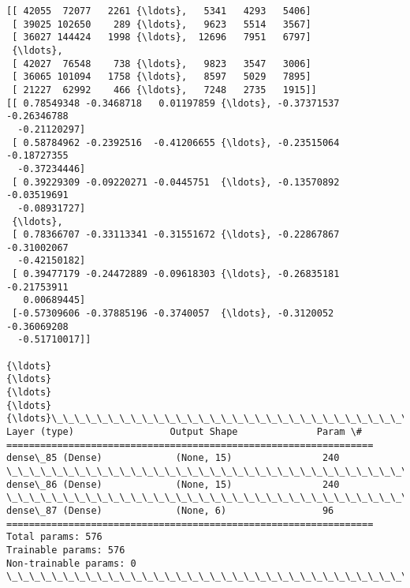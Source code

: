 \documentclass[11pt]{article}
\begin{document}
    \begin{Verbatim}[commandchars=\\\{\}]
[[ 42055  72077   2261 {\ldots},   5341   4293   5406]
 [ 39025 102650    289 {\ldots},   9623   5514   3567]
 [ 36027 144424   1998 {\ldots},  12696   7951   6797]
 {\ldots}, 
 [ 42027  76548    738 {\ldots},   9823   3547   3006]
 [ 36065 101094   1758 {\ldots},   8597   5029   7895]
 [ 21227  62992    466 {\ldots},   7248   2735   1915]]
[[ 0.78549348 -0.3468718   0.01197859 {\ldots}, -0.37371537 -0.26346788
  -0.21120297]
 [ 0.58784962 -0.2392516  -0.41206655 {\ldots}, -0.23515064 -0.18727355
  -0.37234446]
 [ 0.39229309 -0.09220271 -0.0445751  {\ldots}, -0.13570892 -0.03519691
  -0.08931727]
 {\ldots}, 
 [ 0.78366707 -0.33113341 -0.31551672 {\ldots}, -0.22867867 -0.31002067
  -0.42150182]
 [ 0.39477179 -0.24472889 -0.09618303 {\ldots}, -0.26835181 -0.21753911
   0.00689445]
 [-0.57309606 -0.37885196 -0.3740057  {\ldots}, -0.3120052  -0.36069208
  -0.51710017]]

{\ldots}
{\ldots}
{\ldots}
{\ldots}
{\ldots}\_\_\_\_\_\_\_\_\_\_\_\_\_\_\_\_\_\_\_\_\_\_\_\_\_\_\_\_\_\_\_\_\_\_\_\_\_\_\_\_\_\_\_\_\_\_\_\_\_\_\_\_\_\_\_\_\_\_\_\_\_\_\_\_\_
Layer (type)                 Output Shape              Param \#   
=================================================================
dense\_85 (Dense)             (None, 15)                240       
\_\_\_\_\_\_\_\_\_\_\_\_\_\_\_\_\_\_\_\_\_\_\_\_\_\_\_\_\_\_\_\_\_\_\_\_\_\_\_\_\_\_\_\_\_\_\_\_\_\_\_\_\_\_\_\_\_\_\_\_\_\_\_\_\_
dense\_86 (Dense)             (None, 15)                240       
\_\_\_\_\_\_\_\_\_\_\_\_\_\_\_\_\_\_\_\_\_\_\_\_\_\_\_\_\_\_\_\_\_\_\_\_\_\_\_\_\_\_\_\_\_\_\_\_\_\_\_\_\_\_\_\_\_\_\_\_\_\_\_\_\_
dense\_87 (Dense)             (None, 6)                 96        
=================================================================
Total params: 576
Trainable params: 576
Non-trainable params: 0
\_\_\_\_\_\_\_\_\_\_\_\_\_\_\_\_\_\_\_\_\_\_\_\_\_\_\_\_\_\_\_\_\_\_\_\_\_\_\_\_\_\_\_\_\_\_\_\_\_\_\_\_\_\_\_\_\_\_\_\_\_\_\_\_\_

    \end{Verbatim}

    \begin{center}
    \end{center}
    { \hspace*{\fill} \\}
    
    \begin{center}
    \end{center}
    { \hspace*{\fill} \\}
    
    \begin{center}
    \end{center}
    { \hspace*{\fill} \\}
    

    
    
    
    
\end{document}
